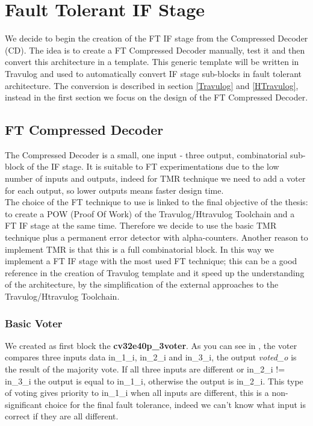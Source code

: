 \chapter{Fault Tolerant IF Stage}{
    \label{FaultTolerantIfStage}
	We decide to begin the creation of the FT IF stage from the Compressed Decoder (CD).
    The idea is to create a FT Compressed Decoder  manually, test it and then convert this architecture in a template.   
	This generic template will be written in Travulog and used to automatically convert IF stage sub-blocks in fault tolerant architecture.
    The conversion is described in section \ref{Travulog} and  \ref{HTravulog}, instead in the first section we focus on the design of the FT Compressed Decoder. \\
    
    \section{FT Compressed Decoder}{
	
		The Compressed Decoder is a small, one input - three output, combinatorial sub-block of the IF stage. 
		It is suitable to FT experimentations due to the low number of inputs and outputs, indeed  for TMR technique we need to add a voter for each output, so lower outputs means faster design time.\\
		
		The choice of the FT technique to use is linked to the final objective of the thesis: to create a POW (Proof Of Work) of the Travulog/Htravulog Toolchain and a FT IF stage at the same time.
		Therefore we decide to use the basic TMR technique plus a permanent error detector with alpha-counters.
		Another reason to implement TMR is that this is a full combinatorial block.
		In this way we implement a FT IF stage with the most used FT technique; this can be a good reference in the creation of Travulog template and it speed up the understanding of the architecture, by the simplification of the external approaches to the Travulog/Htravulog Toolchain.\\
		
		\subsection{Basic Voter}{
    		We created as first block the \textbf{cv32e40p\_3voter}. 
    		As you can see in , the voter compares three inputs data in\_1\_i, in\_2\_i and in\_3\_i, the output \textit{voted\_o} is the result of the majority vote. 
    		If all three inputs are different or in\_2\_i != in\_3\_i the output is equal to in\_1\_i, otherwise the output is in\_2\_i. 
    		This type of voting gives priority to in\_1\_i when all inputs are different, this is a non-significant choice for the final fault tolerance, indeed we can't know what input is correct if they are all different.
    		
}}}
